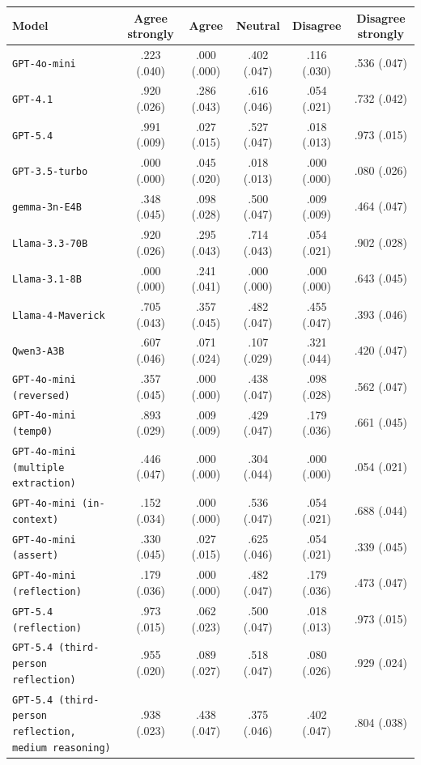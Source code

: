 \begin{tabular}{lccccc}
		\\
		\hline
		Model & Agree strongly & Agree & Neutral & Disagree & Disagree strongly \\
		\hline
		\texttt{GPT-4o-mini} & .223 (.040) & .000 (.000) & .402 (.047) & .116 (.030) & .536 (.047) \\
		\texttt{GPT-4.1} & .920 (.026) & .286 (.043) & .616 (.046) & .054 (.021) & .732 (.042) \\
		\texttt{GPT-5.4} & .991 (.009) & .027 (.015) & .527 (.047) & .018 (.013) & .973 (.015) \\
		\texttt{GPT-3.5-turbo} & .000 (.000) & .045 (.020) & .018 (.013) & .000 (.000) & .080 (.026) \\
		\texttt{gemma-3n-E4B} & .348 (.045) & .098 (.028) & .500 (.047) & .009 (.009) & .464 (.047) \\
		\texttt{Llama-3.3-70B} & .920 (.026) & .295 (.043) & .714 (.043) & .054 (.021) & .902 (.028) \\
		\texttt{Llama-3.1-8B} & .000 (.000) & .241 (.041) & .000 (.000) & .000 (.000) & .643 (.045) \\
		\texttt{Llama-4-Maverick} & .705 (.043) & .357 (.045) & .482 (.047) & .455 (.047) & .393 (.046) \\
		\texttt{Qwen3-A3B} & .607 (.046) & .071 (.024) & .107 (.029) & .321 (.044) & .420 (.047) \\
		\texttt{GPT-4o-mini (reversed)} & .357 (.045) & .000 (.000) & .438 (.047) & .098 (.028) & .562 (.047) \\
		\texttt{GPT-4o-mini (temp0)} & .893 (.029) & .009 (.009) & .429 (.047) & .179 (.036) & .661 (.045) \\
		\texttt{GPT-4o-mini (multiple extraction)} & .446 (.047) & .000 (.000) & .304 (.044) & .000 (.000) & .054 (.021) \\
		\texttt{GPT-4o-mini (in-context)} & .152 (.034) & .000 (.000) & .536 (.047) & .054 (.021) & .688 (.044) \\
		\texttt{GPT-4o-mini (assert)} & .330 (.045) & .027 (.015) & .625 (.046) & .054 (.021) & .339 (.045) \\
		\texttt{GPT-4o-mini (reflection)} & .179 (.036) & .000 (.000) & .482 (.047) & .179 (.036) & .473 (.047) \\
		\texttt{GPT-5.4 (reflection)} & .973 (.015) & .062 (.023) & .500 (.047) & .018 (.013) & .973 (.015) \\
		\texttt{GPT-5.4 (third-person reflection)} & .955 (.020) & .089 (.027) & .518 (.047) & .080 (.026) & .929 (.024) \\
		\texttt{GPT-5.4 (third-person reflection, medium reasoning)} & .938 (.023) & .438 (.047) & .375 (.046) & .402 (.047) & .804 (.038) \\
		\hline
\end{tabular}


